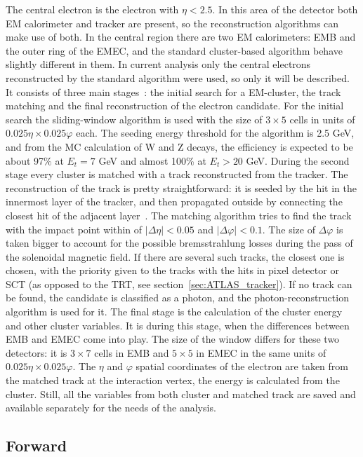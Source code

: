 The central electron is the electron with $\eta < 2.5$. In this area of the detector both EM calorimeter and tracker are present, so the reconstruction algorithms can make use of both. In the central region there are two  EM calorimeters: EMB and the outer ring of the EMEC, and the standard cluster-based algorithm behave slightly different in them. In current analysis only the central electrons reconstructed by the standard algorithm were used, so only it will be described. It consists of three main stages~\cite{lib:elec_reco}: the initial search for a EM-cluster, the track matching and the final reconstruction of the electron candidate. For the initial search the sliding-window algorithm is used with the size of $3 \times 5$ cells in units of $0.025 \eta \times 0.025 \varphi$ each. The seeding energy threshold for the algorithm is 2.5 GeV, and from the MC calculation of W and Z decays, the efficiency is expected to be about 97\% at $E_{t} = 7$ GeV and almost 100\% at $E_{t} > 20$ GeV. During the second stage every cluster is matched with a track reconstructed from the tracker. The reconstruction of the track is pretty straightforward: it is seeded by the hit in the innermost layer of the tracker, and then propagated outside by connecting the closest hit of the adjacent layer~\cite{lib:track_reco}. The matching algorithm tries to find the track with the impact point within of $|\Delta\eta| < 0.05$ and $|\Delta\varphi| < 0.1$. The size of $\Delta\varphi$ is taken bigger to account for the possible bremsstrahlung losses during the pass of the solenoidal magnetic field. If there are several such tracks, the closest one is chosen, with the priority given to the tracks with the hits in pixel detector or SCT (as opposed to the TRT, see section~\ref{sec:ATLAS_tracker}). If no track can be found, the candidate is classified as a photon, and the photon-reconstruction algorithm is used for it. The final stage is the calculation of the cluster energy and other cluster variables. It is during this stage, when the differences between EMB and EMEC come into play. The size of the window differs for these two detectors: it is $3 \times 7$ cells in EMB and $5 \times 5$ in EMEC in the same units of $0.025 \eta \times 0.025 \varphi$. The $\eta$ and $\varphi$ spatial coordinates of the electron are taken from the matched track at the interaction vertex, the energy is calculated from the cluster. Still, all the variables from both cluster and matched track are saved and available separately for the needs of the analysis.

\subsection{Forward}


